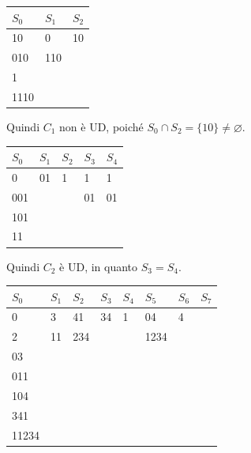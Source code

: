 \begin{enumerate}
       \begin{table}[htbp]
       \begin{center}
       \begin{tabular}{l | l | l}
        $S_0$ & $S_1$  & $S_2$ \\
        \hline
        10   & 0   & 10  \\
        010  & 110 &     \\
        1    &     &     \\
        1110 &     &     \\
       \end{tabular}
       \end{center}
       \end{table}

       Quindi $C_1$ non è UD, poiché $S_0 \cap S_2 = \{10\} \neq \varnothing $.

       \begin{table}[htbp]
       \begin{center}
       \begin{tabular}{l | l | l | l | l}
        $S_0$ & $S_1$  & $S_2$ & $S_3$ & $S_4$\\
        \hline
        0   & 01 & 1 & 1  & 1  \\
        001 &    &   & 01 & 01 \\
        101 &    &   &    &    \\
        11  &    &   &    &   \\
       \end{tabular}
       \end{center}
       \end{table}

       Quindi $C_2$ è UD, in quanto $S_3=S_4$.

       \begin{table}[htbp]
       \begin{center}
       \begin{tabular}{l | l | l | l | l | l | l | l}
        $S_0$ & $S_1$  & $S_2$ & $S_3$ & $S_4$ & $S_5$ & $S_6$ & $S_7$ \\
        \hline
        0     & 3  & 41  & 34 & 1 & 04   & 4 &\\
        2     & 11 & 234 &    &   & 1234 &   &\\
        03    &    &     &    &   &      &   &\\
        011   &    &     &    &   &      &   &\\
        104   &    &     &    &   &      &   &\\
        341   &    &     &    &   &      &   &\\
        11234 &    &     &    &   &      &   &\\
       \end{tabular}
       \end{center}
       \end{table}


\end{enumerate}
